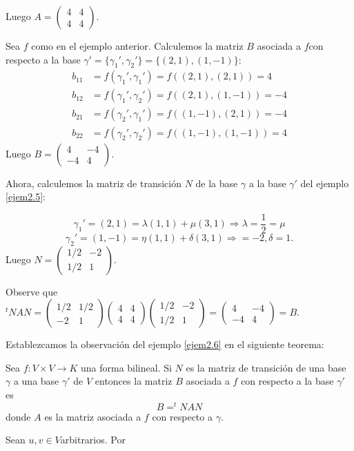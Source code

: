 		Luego $ A = \left(\begin{matrix}
		4 & 4 \\ 4 & 4
		\end{matrix}\right) $.
		\begin{ejem} \label{ejem2.6}
			\normalfont 
			Sea $ f $ como en el ejemplo anterior. Calculemos la matriz $ B $ asociada a $ f  $con respecto a la base $ \gamma' = \{\gamma_{1}', \gamma_{2}'\} =   \{(2, 1), (1, -1)\}:
			$
			\begin{align*}
			b_{11} &= f (\gamma_{1}', \gamma_{1}' ) = f ((2, 1), (2, 1)) =  4 \\  	b_{12} &= f (\gamma_{1}', \gamma_{2}' ) = f ((2, 1), (1, -1)) = -4 \\ b_{21} &= f (\gamma_{2}', \gamma_{1}' ) = f ((1, -1), (2, 1)) = -4  \\ b_{22} &= f (\gamma_{2}', \gamma_{2}' ) = f((1, -1), (1, -1)) =  4
			\end{align*}
				Luego $ B = \left(\begin{matrix}
			4 & -4 \\ -4 & 4
			\end{matrix}\right) $.
		\end{ejem}
		Ahora, calculemos la matriz de transición $ N $ de la base $\gamma$ a la base $\gamma'$ del ejemplo \ref{ejem2.5}:
		
		\[ \gamma_{1}' = (2,1) = \lambda(1,1)+\mu(3,1) \Longrightarrow \lambda = \frac{1}{2} = \mu \]
		\[ \gamma_{2}' = (1,-1) = \eta(1,1)+\delta(3,1) \Longrightarrow = -2, \delta = 1. \]
		Luego $ N = \left(\begin{matrix}
		1/2  & -2\\ 1/2  & 1
		\end{matrix}\right) $.
		
		Observe que  $ ^{t}N AN = \left(\begin{matrix}
		1/2  & 1/2\\ -2  & 1
		\end{matrix}\right)\left(\begin{matrix}
		4 & 4 \\ 4 & 4
		\end{matrix}\right)\left(\begin{matrix}
		1/2  & -2\\ 1/2  & 1
		\end{matrix}\right) = \left(\begin{matrix}
		4 & -4 \\ -4 & 4
		\end{matrix}\right) = B.$
		
		Establezcamos la observación del ejemplo \ref{ejem2.6} en el siguiente teorema:
		\begin{teo} \normalfont
			Sea $ f : V \times V \longrightarrow K $ una forma bilineal. Si $ N $ es la matriz de transición de una base $\gamma$ a una base $\gamma'$ de $ V $ entonces la matriz $  B  $ asociada a $ f $ con respecto a la base $\gamma'$ es
			\[ B = ^{t}N AN \]
			donde $ A $ es la matriz asociada a $ f $ con respecto a $\gamma$.
		\end{teo}
		\begin{demo}
			\normalfont 
			 Sean $ u, v \in V  $arbitrarios. Por
		\end{demo}